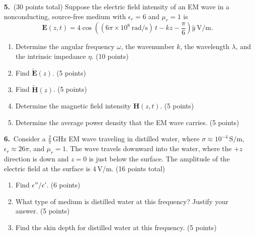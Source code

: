 \documentclass[12pt,letterpaper]{article}
\begin{document}
\newpage

\textbf{5.}\ (30 points total) Suppose the electric field intensity of an EM wave in a
nonconducting, source-free medium with $\epsilon_r = 6$ and $\mu_r = 1$ is
\[
  \mathbf{E}(z,t) = 4\cos\!\left((6\pi \times 10^8\ \mathrm{rad/s})\,t - kz
    - \frac{\pi}{6}\right)\hat{y}\ \mathrm{V/m}.
\]

\begin{enumerate}[label=(\alph*), leftmargin=2.5cm]

  \item Determine the angular frequency $\omega$, the wavenumber $k$, the wavelength
        $\lambda$, and the intrinsic impedance $\eta$.
        \hfill(10 points)
  \vspace{8cm}

  \item Find $\tilde{\mathbf{E}}(z)$.
        \hfill(5 points)
  \vspace{4.5cm}

  \item Find $\tilde{\mathbf{H}}(z)$.
        \hfill(5 points)
  \vspace{4.5cm}

  \item Determine the magnetic field intensity $\mathbf{H}(z,t)$.
        \hfill(5 points)
  \vspace{4.5cm}

  \item Determine the average power density that the EM wave carries.
        \hfill(5 points)
  \vspace{4cm}

\end{enumerate}

\newpage

\textbf{6.}\ Consider a $\tfrac{2}{\pi}\,\mathrm{GHz}$ EM wave traveling in distilled
water, where $\sigma \approx 10^{-4}\,\mathrm{S/m}$, $\epsilon_r \approx 26\pi$, and
$\mu_r = 1$. The wave travels downward into the water, where the $+z$ direction is down
and $z = 0$ is just below the surface. The amplitude of the electric field at the surface
is $4\,\mathrm{V/m}$. (16 points total)

\begin{enumerate}[label=(\alph*), leftmargin=2.5cm]

  \item Find $\epsilon''/\epsilon'$.
        \hfill(6 points)
  \vspace{7cm}

  \item What type of medium is distilled water at this frequency? Justify your answer.
        \hfill(5 points)
  \vspace{6cm}

  \item Find the skin depth for distilled water at this frequency.
        \hfill(5 points)
  \vspace{6cm}

\end{enumerate}
\end{document}
